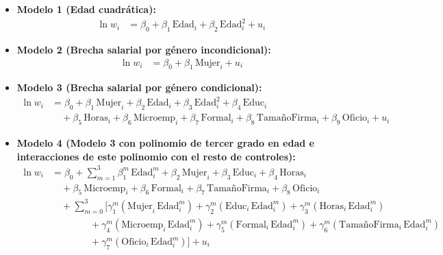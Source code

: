 \documentclass[12pt,a4paper,onecolumn]{article}
\begin{document}
\begin{itemize}

\item \textbf{Modelo 1 (Edad cuadrática):}
{\small
\[
\begin{aligned}
\ln w_{i} &= \beta_{0} 
+ \beta_{1}\,\text{Edad}_{i}
+ \beta_{2}\,\text{Edad}_{i}^{2}
+ u_{i}
\end{aligned}
\]
}

\item \textbf{Modelo 2 (Brecha salarial por género incondicional):}
{\small
\[
\begin{aligned}
\ln w_{i} &= \beta_{0} 
+ \beta_{1}\,\text{Mujer}_{i}
+ u_{i}
\end{aligned}
\]
}

\item \textbf{Modelo 3 (Brecha salarial por género condicional):}
{\small
\[
\begin{aligned}
\ln w_{i} &= \beta_{0} 
+ \beta_{1}\,\text{Mujer}_{i}
+ \beta_{2}\,\text{Edad}_{i}
+ \beta_{3}\,\text{Edad}_{i}^{2}
+ \beta_{4}\,\text{Educ}_{i}
\\&\quad
+ \beta_{5}\,\text{Horas}_{i}
+ \beta_{6}\,\text{Microemp}_{i}
+ \beta_{7}\,\text{Formal}_{i}
+ \beta_{8}\,\text{TamañoFirma}_{i}
+ \beta_{9}\,\text{Oficio}_{i}
+ u_{i}
\end{aligned}
\]
}

\item \textbf{Modelo 4 (Modelo 3 con polinomio de tercer grado en edad e interacciones de este polinomio con el resto de controles):}
{\small
\[
\begin{aligned}
\ln w_{i} &= \beta_{0} 
+ \sum_{m=1}^{3} \beta_{1}^{m}\,\text{Edad}_{i}^{m}
+ \beta_{2}\,\text{Mujer}_{i}
+ \beta_{3}\,\text{Educ}_{i}
+ \beta_{4}\,\text{Horas}_{i}
\\&\quad
+ \beta_{5}\,\text{Microemp}_{i}
+ \beta_{6}\,\text{Formal}_{i}
+ \beta_{7}\,\text{TamañoFirma}_{i}
+ \beta_{8}\,\text{Oficio}_{i}
\\&\quad
+ \sum_{m=0}^{3}\Big[
\gamma_{1}^{m}(\text{Mujer}_{i}\,\text{Edad}_{i}^{m})
+ \gamma_{2}^{m}(\text{Educ}_{i}\,\text{Edad}_{i}^{m})
+ \gamma_{3}^{m}(\text{Horas}_{i}\,\text{Edad}_{i}^{m})
\\&\qquad\qquad
+ \gamma_{4}^{m}(\text{Microemp}_{i}\,\text{Edad}_{i}^{m})
+ \gamma_{5}^{m}(\text{Formal}_{i}\,\text{Edad}_{i}^{m})
+ \gamma_{6}^{m}(\text{TamañoFirma}_{i}\,\text{Edad}_{i}^{m})
\\&\qquad\qquad
+ \gamma_{7}^{m}(\text{Oficio}_{i}\,\text{Edad}_{i}^{m})
\Big]
+ u_{i}
\end{aligned}
\]
}


\end{itemize}
\end{document}
